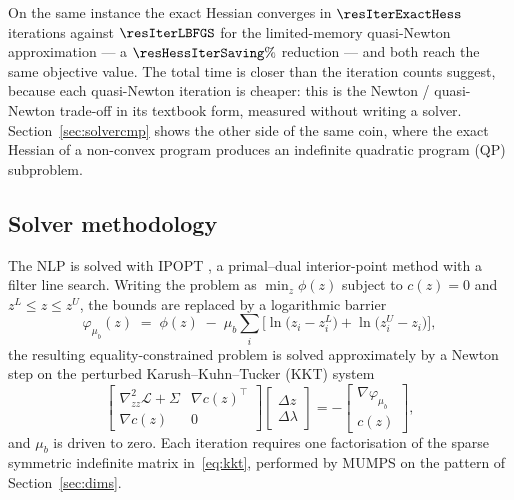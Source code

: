 \documentclass[11pt,a4paper]{article}
\begin{document}
\begin{table}[htbp]
  \centering
  \small
  \caption{Interior-point iterations with the exact Hessian and with the limited-memory quasi-Newton approximation, on the same instance. Bold: the lower iteration count.}
  \label{res:tab:hess}
\end{table}

On the same instance the exact Hessian converges in $\resIterExactHess$ iterations against $\resIterLBFGS$
for the limited-memory quasi-Newton approximation --- a $\resHessIterSaving\%$ reduction --- and both reach
the same objective value. The total time is closer than the iteration counts suggest, because each
quasi-Newton iteration is cheaper: this is the Newton / quasi-Newton trade-off in its textbook form,
measured without writing a solver. Section~\ref{sec:solvercmp} shows the other side of the same coin, where
the exact Hessian of a non-convex program produces an indefinite quadratic
program (QP) subproblem.

\subsection{Solver methodology}
\label{sec:solver}

The NLP is solved with IPOPT \cite{wachter2006ipopt}, a primal--dual interior-point method with a filter
line search. Writing the problem as $\min_z \phi(z)$ subject to $c(z)=0$ and $z^L\le z\le z^U$, the bounds
are replaced by a logarithmic barrier
\begin{equation}
  \varphi_{\mu_b}(z) \;=\; \phi(z) \;-\; \mu_b\sum_i\Big[\ln\!\big(z_i-z_i^L\big)+\ln\!\big(z_i^U-z_i\big)\Big],
  \label{eq:ipopt}
\end{equation}
the resulting equality-constrained problem is solved approximately by a Newton step on the perturbed Karush--Kuhn--Tucker (KKT)
system
\begin{equation}
  \begin{bmatrix}
    \nabla^2_{zz}\mathcal{L} + \Sigma & \nabla c(z)^{\!\top}\\
    \nabla c(z) & 0
  \end{bmatrix}
  \begin{bmatrix}\Delta z\\ \Delta\lambda\end{bmatrix}
  = -\begin{bmatrix}\nabla\varphi_{\mu_b}\\ c(z)\end{bmatrix},
  \label{eq:kkt}
\end{equation}
and $\mu_b$ is driven to zero. Each iteration requires one factorisation of the sparse symmetric indefinite
matrix in~\eqref{eq:kkt}, performed by MUMPS on the pattern of Section~\ref{sec:dims}.
\end{document}
